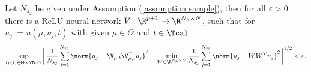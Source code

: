 \begin{lemma} \label{lemma: optimal projection error}
    Let $N_{s_2}$ be given under Assumption (\ref{assumption sample}), then for all $\varepsilon > 0$ there is a ReLU neural network
    $V: \R^{p+1} \to \R^{N_h \times N}$, such that for $u_j := u(\mu, \nu_j, t)$ with given $\mu \in \Theta$ and $t \in \Tcal$
    \begin{equation*}
        \sup\limits_{(\mu, t) \in \Theta \times \Tcal} \bigg\vert \, \frac{1}{N_{s_2}} \sum_{j=1}^{N_{s_2}} \norm{u_j - \V_{\mu, t} \V_{\mu, t}^T u_j}^2 \\
        - \min\limits_{W \in \R^{N_h \times N}} \frac{1}{N_{s_2}} \sum_{j = 1}^{N_{s_2}} \norm{u_j - W W^T u_j}^2 \, \bigg\vert^{1/2} < \varepsilon.
    \end{equation*}
\end{lemma}
